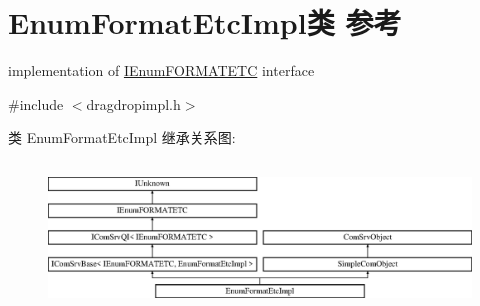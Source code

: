 \hypertarget{class_enum_format_etc_impl}{}\section{Enum\+Format\+Etc\+Impl类 参考}
\label{class_enum_format_etc_impl}


implementation of \hyperlink{interface_i_enum_f_o_r_m_a_t_e_t_c}{I\+Enum\+F\+O\+R\+M\+A\+T\+E\+TC} interface  




{\ttfamily \#include $<$dragdropimpl.\+h$>$}

类 Enum\+Format\+Etc\+Impl 继承关系图\+:\begin{figure}[H]
\begin{center}
\leavevmode
\includegraphics[height=4.000000cm]{class_enum_format_etc_impl}
\end{center}
\end{figure}

